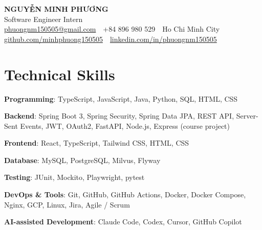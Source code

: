 \documentclass[10pt, a4paper]{article}
\newcommand{\skillrow}[2]{\textbf{#1}: #2\par}
\begin{document}
\color{BodyText}

\begin{center}
  {\fontsize{21pt}{25pt}\selectfont\bfseries\color{NavyBlue} NGUYỄN MINH PHƯƠNG}\\[3pt]
  {\fontsize{12.5pt}{15pt}\selectfont\color{MutedText} Software Engineer Intern}\\[4pt]
  {\footnotesize
  \href{mailto:phuongnm150505@gmail.com}{phuongnm150505@gmail.com}
  \,\textbar\, +84 896 980 529
  \,\textbar\, Ho Chi Minh City
  \,\textbar\, \href{https://github.com/minhphuong150505}{github.com/minhphuong150505}
  \,\textbar\, \href{https://www.linkedin.com/in/phuongnm150505/}{linkedin.com/in/phuongnm150505}}
\end{center}
\vspace{-6pt}

\section{Technical Skills}
\skillrow{Programming}{TypeScript, JavaScript, Java, Python, SQL, HTML, CSS}
\skillrow{Backend}{Spring Boot 3, Spring Security, Spring Data JPA, REST API, Server-Sent Events, JWT, OAuth2, FastAPI, Node.js, Express (course project)}
\skillrow{Frontend}{React, TypeScript, Tailwind CSS, HTML, CSS}
\skillrow{Database}{MySQL, PostgreSQL, Milvus, Flyway}
\skillrow{Testing}{JUnit, Mockito, Playwright, pytest}
\skillrow{DevOps \& Tools}{Git, GitHub, GitHub Actions, Docker, Docker Compose, Nginx, GCP, Linux, Jira, Agile / Scrum}
\skillrow{AI-assisted Development}{Claude Code, Codex, Cursor, GitHub Copilot}

\end{document}
